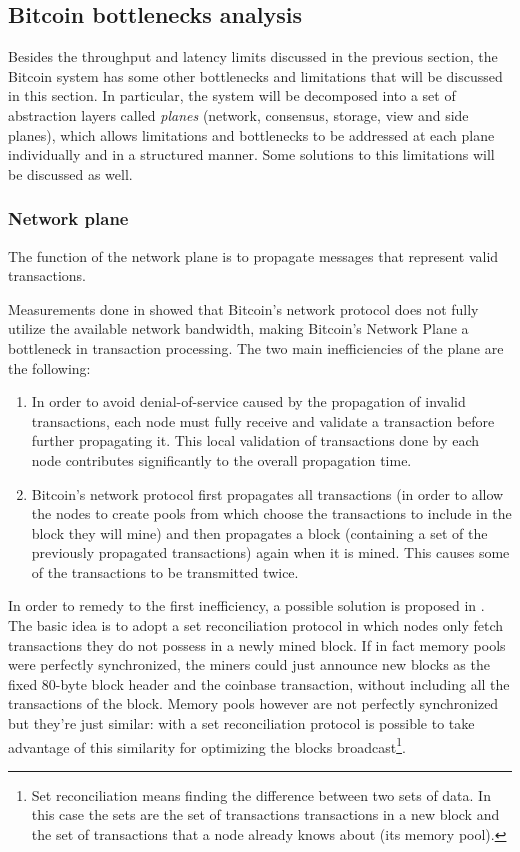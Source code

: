 \subsection{Bitcoin bottlenecks analysis}  Besides the throughput and latency
limits discussed in the previous section, the Bitcoin system has some other
bottlenecks and limitations that will be  discussed in this section. In
particular, the system will be decomposed into a set of abstraction layers
called \emph{planes} (network, consensus, storage, view and side planes), which
allows limitations and bottlenecks to be addressed at each plane individually
and in a structured manner. Some solutions to this limitations will be discussed
as well.

\subsubsection{Network plane}
The function of the network plane is to propagate messages that represent
valid transactions.

Measurements done in \cite{croman-scaling-blockchain} showed that Bitcoin’s
network protocol does not fully utilize the available network bandwidth,
making Bitcoin’s Network Plane a bottleneck in transaction processing. The two
main inefficiencies of the plane are the following:
\begin{enumerate}
  \item In order to avoid denial-of-service caused by the propagation of invalid
  transactions, each node must fully receive and validate a transaction before
  further propagating it. This local validation of transactions done by each node
  contributes significantly to the overall propagation time.
  \item Bitcoin’s network protocol first propagates all transactions (in order
  to allow the nodes to create pools from which choose the transactions to include
  in the block they will mine) and then propagates a block (containing a set of
  the previously propagated transactions) again when it is mined. This causes
  some of the transactions to be transmitted twice.
\end{enumerate}

In order to remedy to the first inefficiency, a possible solution is proposed in
\cite{andresen}. The basic idea is to adopt a set reconciliation protocol in
which nodes only fetch transactions they do not possess in a newly mined block.
If in fact memory pools were perfectly synchronized, the miners could just
announce new blocks as the fixed 80-byte block header and the coinbase
transaction, without including all the transactions of the block. Memory pools
however are not perfectly synchronized but they're just similar: with a set
reconciliation protocol is possible to take advantage of this similarity for
optimizing the blocks broadcast\footnote{Set reconciliation means finding the
difference between two sets of data. In this case the sets are the set of
transactions transactions in a new block and the set of transactions that a node
already knows about (its memory pool).}.


